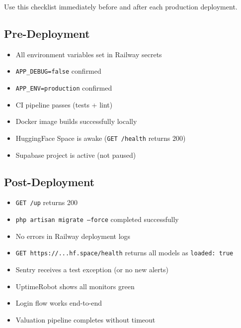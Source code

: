 \documentclass[12pt,a4paper]{report}
\begin{document}
Use this checklist immediately before and after each production
deployment.

\subsection*{Pre-Deployment}

\begin{itemize}[leftmargin=1.5em, label=$\square$]
    \item All environment variables set in Railway secrets
    \item \texttt{APP\_DEBUG=false} confirmed
    \item \texttt{APP\_ENV=production} confirmed
    \item CI pipeline passes (tests + lint)
    \item Docker image builds successfully locally
    \item HuggingFace Space is awake (\texttt{GET /health} returns 200)
    \item Supabase project is active (not paused)
\end{itemize}

\subsection*{Post-Deployment}

\begin{itemize}[leftmargin=1.5em, label=$\square$]
    \item \texttt{GET /up} returns 200
    \item \texttt{php artisan migrate --force} completed successfully
    \item No errors in Railway deployment logs
    \item \texttt{GET https://...hf.space/health} returns all models
          as \texttt{loaded: true}
    \item Sentry receives a test exception (or no new alerts)
    \item UptimeRobot shows all monitors green
    \item Login flow works end-to-end
    \item Valuation pipeline completes without timeout
\end{itemize}
\end{document}

